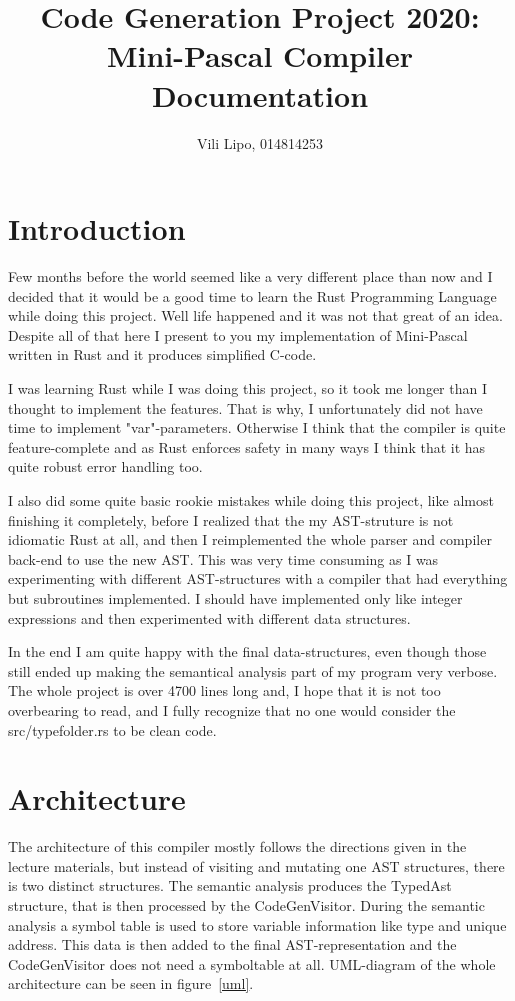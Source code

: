 \documentclass[12pt,a4paper]{article}
\author{Vili Lipo, 014814253}
\title{Code Generation Project 2020: Mini-Pascal Compiler Documentation}
\begin{document}
\maketitle{}
\section{Introduction}

Few months before the world seemed like a very different place than now and I
decided that it would be a good time to learn the Rust Programming Language
while doing this project. Well life happened and it was not that great of an
idea. Despite all of that here I present to you my implementation of Mini-Pascal
written in Rust and it produces simplified C-code.

I was learning Rust while I was doing this project, so  it took me longer
than I thought to implement the features. That is why, I unfortunately did not
have time to implement "var"-parameters. Otherwise I think that
the compiler is quite feature-complete and as Rust enforces safety in many
ways I think that it has quite robust error handling too.

I also did some quite basic rookie mistakes while doing this project, like
almost finishing it completely, before I realized that the my AST-struture is
not idiomatic Rust at all, and then I reimplemented the whole parser and
compiler back-end to use the new AST.  This was very time consuming as I was
experimenting with different AST-structures with a compiler that had everything
but subroutines implemented.  I should have implemented only like integer
expressions and then experimented with different data structures.

In the end I am quite happy with the final data-structures, even though those
still ended up making the semantical analysis part of my program very verbose.
The whole project is over 4700 lines long and, I hope that it is not too
overbearing to read, and I fully recognize that no one would consider the
src/typefolder.rs to be clean code.

\section{Architecture}

The architecture of this compiler mostly follows the directions
given in the lecture materials, but instead of visiting and mutating
one AST structures, there is two distinct structures. The semantic
analysis produces the TypedAst structure, that is then
processed by the CodeGenVisitor. During the semantic analysis
a symbol table is used to store variable information like type and unique address.
This data is then added to the final AST-representation and the CodeGenVisitor does
not need a symboltable at all. UML-diagram of the whole architecture can be
seen in figure~\ref{uml}.
\end{document}
